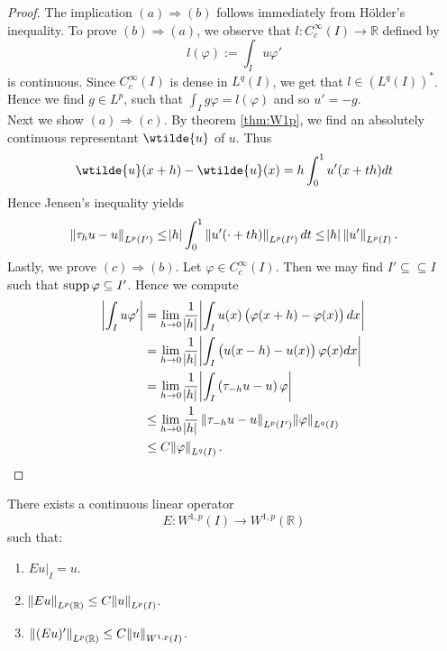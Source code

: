 \begin{proof}
	The implication $(a)\Rightarrow(b)$ follows immediately from H\"older's inequality. To prove $(b)\Rightarrow(a)$, we observe that $l : C^\infty_c(I) \to \mathbb{R}$ defined by
	\begin{equation*}
		l(\varphi) := \int_I u \varphi'
	\end{equation*}
	\noindent is continuous. Since $C^\infty_c(I)$ is dense in $L^q(I)$, we get that $l \in (L^q(I))^*$. Hence we find $g \in L^p$, such that $\int_I g\varphi = l(\varphi)$ and so $u' = -g$.\\
	Next we show $(a)\Rightarrow(c)$. By theorem \ref{thm:W1p}, we find an absolutely continuous representant $\wtilde{u}$ of $u$. Thus
	\begin{equation*}
		\wtilde{u}(x + h) - \wtilde{u}(x) = h\int_0^1 u'(x + th) dt
	\end{equation*}
	Hence Jensen's inequality yields
	\begin{equation*}
		\norm[0]{\tau_hu - u}_{L^p(I')} \leq \abs{h} \int_0^1 \norm[0]{u'(\cdot + th)}_{L^p(I')}dt \leq \abs{h} \norm[0]{u'}_{L^p(I)}.
	\end{equation*}
	Lastly, we prove $(c)\Rightarrow(b)$. Let $\varphi \in C^\infty_c(I)$. Then we may find $I' \subseteq \subseteq I$ such that $\operatorname{supp} \varphi\subseteq I'$. Hence we compute
	\begin{align*}
		\abs[3]{\int_I u\varphi'} &= \lim_{h \to 0}\frac{1}{\abs{h}} \abs[3]{\int_I u(x) \del[1]{\varphi(x + h) - \varphi(x)} dx}\\
		&= \lim_{h \to 0}\frac{1}{\abs{h}} \abs[3]{\int_I \del[1]{u(x - h) - u(x)} \varphi(x)dx}\\
		&= \lim_{h \to 0}\frac{1}{\abs{h}} \abs[3]{\int_I \del[0]{\tau_{-h}u - u}\varphi}\\
		&\leq \lim_{h \to 0}\frac{1}{\abs{h}}\norm[0]{\tau_{-h}u - u}_{L^p(I')}\norm{\varphi}_{L^q(I)}\\
		&\leq C\norm{\varphi}_{L^q(I)}.
	\end{align*}
\end{proof}

\begin{theorem}
	\label{thm:extension}
	There exists a continuous linear operator 
	\begin{equation*}
		E : W^{1,p}(I) \to W^{1,p}(\mathbb{R})
	\end{equation*}
	\noindent such that:
	\begin{enumerate}[label = \textup{(}\roman*\textup{)},wide = 0pt]
		\item $Eu\vert_I = u$.
		\item $\norm{Eu}_{L^p(\mathbb{R})} \leq C \norm{u}_{L^p(I)}$.
		\item $\norm[0]{(Eu)'}_{L^p(\mathbb{R})} \leq C\norm{u}_{W^{1,p}(I)}$.
	\end{enumerate}
\end{theorem}

